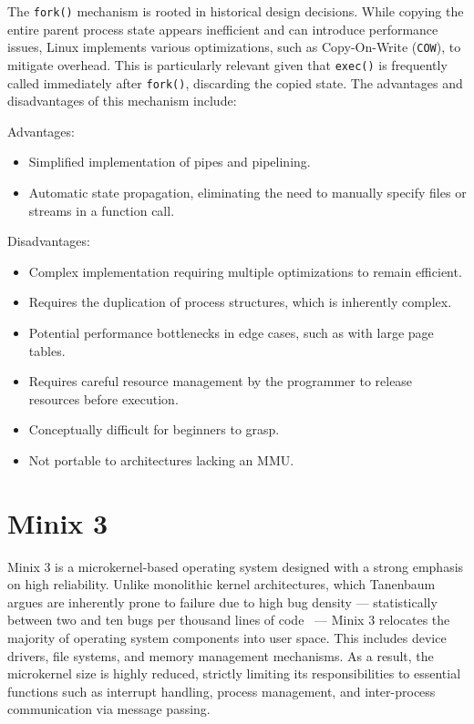 \documentclass[a4paper,10pt,twoside]{report}
\theoremstyle{definition}
\begin{document}
The \texttt{fork()} mechanism is rooted in historical design decisions. While copying the entire parent process state appears inefficient and can introduce performance issues, Linux implements various optimizations, such as Copy-On-Write (\texttt{COW}), to mitigate overhead. This is particularly relevant given that \texttt{exec()} is frequently called immediately after \texttt{fork()}, discarding the copied state. The advantages and disadvantages of this mechanism include:

\noindent Advantages:
\begin{itemize}
    \item Simplified implementation of pipes and pipelining.
    \item Automatic state propagation, eliminating the need to manually specify files or streams in a function call.
\end{itemize}

\noindent Disadvantages:
\begin{itemize}
    \item Complex implementation requiring multiple optimizations to remain efficient.
    \item Requires the duplication of process structures, which is inherently complex.
    \item Potential performance bottlenecks in edge cases, such as with large page tables.
    \item Requires careful resource management by the programmer to release resources before execution.
    \item Conceptually difficult for beginners to grasp.
    \item Not portable to architectures lacking an MMU.
\end{itemize}

\section{Minix 3}
\label{sec:minix-research}

Minix 3 is a microkernel-based operating system designed with a strong emphasis on high reliability. Unlike monolithic kernel architectures, which Tanenbaum argues are inherently prone to failure due to high bug density --- statistically between two and ten bugs per thousand lines of code~\cite{tanenbaum2015modern} --- Minix 3 relocates the majority of operating system components into user space. This includes device drivers, file systems, and memory management mechanisms. As a result, the microkernel size is highly reduced, strictly limiting its responsibilities to essential functions such as interrupt handling, process management, and inter-process communication via message passing.
\end{document}

